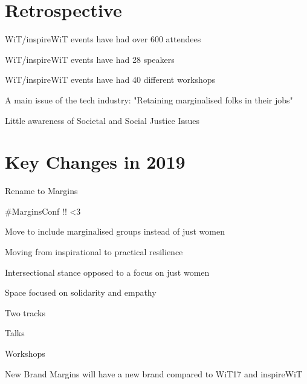\documentclass[11pt,hacksoc]{meetingmins}
\begin{document}
\maketitle

\section{Retrospective}
\begin{items}

\item
WiT/inspireWiT events have had over 600 attendees

\item
WiT/inspireWiT events have had 28 speakers

\item
WiT/inspireWiT events have had 40 different workshops

\item
A main issue of the tech industry: "Retaining marginalised folks in their jobs"

	\subitem
	Little awareness of Societal and Social Justice Issues

	
\end{items}


\section{Key Changes in 2019}
\begin{items}
\item
Rename to Margins

	\subitem
	\#MarginsConf !! <3
	
	\subitem
	Move to include marginalised groups instead of just women
	
\item
Moving from inspirational to practical resilience
	
	\subitem
	Intersectional stance opposed to a focus on just women
	
	\subitem
	Space focused on solidarity and empathy	

\item
Two tracks

	\subitem
	Talks
	
	\subitem
	Workshops
	
\item
New Brand
	\subitem
	Margins will have a new brand compared to WiT17 and inspireWiT
	
	\subitem
	
	\subitem

\end{items}
	
\end{document}
